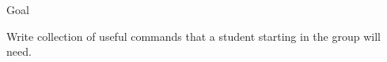 \begin{frame}{Goal}
\Large

\begin{center}
Write collection of useful commands that a student starting in the
group will need.
\end{center}

%
%
%
%
%
%
%
%
%
%
%
%
%

\end{frame}
